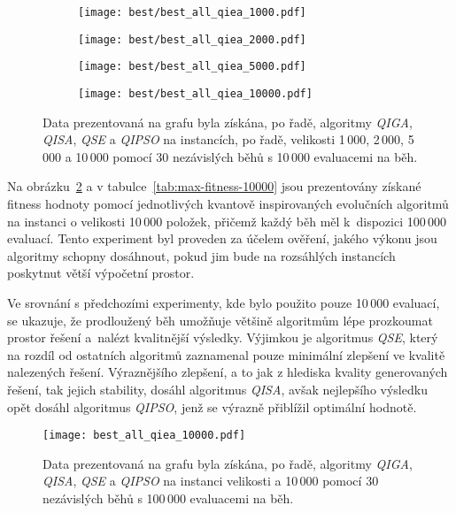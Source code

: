 \begin{figure}[ht!]
    \centering
    \begin{subfigure}[b]{0.48\textwidth}
      \texttt{[image: best/best\_all\_qiea\_1000.pdf]}
    \end{subfigure}
    \hfill
    \begin{subfigure}[b]{0.48\textwidth}
        \texttt{[image: best/best\_all\_qiea\_2000.pdf]}
    \end{subfigure}

    \begin{subfigure}[b]{0.48\textwidth}
      \texttt{[image: best/best\_all\_qiea\_5000.pdf]}
    \end{subfigure}
    \hfill
    \begin{subfigure}[b]{0.48\textwidth}
        \texttt{[image: best/best\_all\_qiea\_10000.pdf]}
    \end{subfigure}
    \caption{Data prezentovaná na grafu byla získána, po řadě, algoritmy \emph{QIGA}, \emph{QISA}, \emph{QSE} a \emph{QIPSO} na instancích, po řadě, velikosti 1\,000, 2\,000, 5\,000 a 10\,000 pomocí 30 nezávislých běhů s 10\,000 evaluacemi na běh.}
    \label{fig:best-10k}
\end{figure}

Na obrázku~\ref{fig:best-100k} a v tabulce~\ref{tab:max-fitness-10000} jsou prezentovány získané fitness hodnoty pomocí jednotlivých kvantově inspirovaných evolučních algoritmů na instanci o velikosti 10\,000 položek, přičemž každý běh měl k~dispozici 100\,000 evaluací.
Tento experiment byl proveden za účelem ověření, jakého výkonu jsou algoritmy schopny dosáhnout, pokud jim bude na rozsáhlých instancích poskytnut větší výpočetní prostor.

Ve srovnání s předchozími experimenty, kde bylo použito pouze 10\,000 evaluací, se ukazuje, že prodloužený běh umožňuje většině algoritmům lépe prozkoumat prostor řešení a~nalézt kvalitnější výsledky. 
Výjimkou je algoritmus \emph{QSE}, který na rozdíl od ostatních algoritmů zaznamenal pouze minimální zlepšení ve kvalitě nalezených řešení. 
Výraznějšího zlepšení, a to jak z hlediska kvality generovaných řešení, tak jejich stability, dosáhl algoritmus \emph{QISA}, avšak nejlepšího výsledku opět dosáhl algoritmus \emph{QIPSO}, jenž se výrazně přiblížil optimální hodnotě. 

\begin{figure}[ht!]
    \centering
    \texttt{[image: best\_all\_qiea\_10000.pdf]}
    \caption{Data prezentovaná na grafu byla získána, po řadě, algoritmy \emph{QIGA}, \emph{QISA}, \emph{QSE} a \emph{QIPSO} na instanci velikosti a 10\,000 pomocí 30 nezávislých běhů s 100\,000 evaluacemi na běh.}
    \label{fig:best-100k}
\end{figure}

